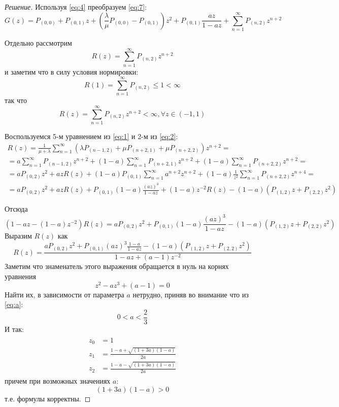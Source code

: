 \documentclass[12pt,a4paper]{article}
\begin{document}
\begin{proof}[Решение]
	Используя \eqref{eq:4} преобразуем \eqref{eq:7}:
	\begin{equation}\label{eq:8}
		G(z) = P_{(0, 0)} + P_{(0, 1)} z + \left(\frac{\lambda}{\mu} P_{(0, 0)} - P_{(0, 1)}\right) z^2 + P_{(0, 1)} \frac{az}{1 - az} + \sum_{n=1}^{\infty}{P_{(n, 2)} z^{n+2}}
	\end{equation}
	
	Отдельно рассмотрим
	\begin{equation*}
		R(z) = \sum_{n=1}^{\infty}{P_{(n, 2)} z^{n+2}}
	\end{equation*}
	и заметим что в силу условия нормировки:
	\begin{equation}\label{eq:11}
		R(1) = \sum_{n=1}^{\infty}{P_{(n, 2)}} \leq 1 < \infty
	\end{equation}
	так что
	\begin{equation}\label{eq:9}
		R(z) = \sum_{n=1}^{\infty}{P_{(n, 2)} z^{n+2}} < \infty, \forall z \in (-1, 1)
	\end{equation}
	
	Воспользуемся 5-м уравнением из \eqref{eq:1} и 2-м из \eqref{eq:2}:
	\begin{multline*}\label{eq:6}
		R(z) = \frac{1}{\mu + \lambda} \sum_{n=1}^{\infty}{\left(\lambda P_{(n-1, 2)} + \mu P_{(n+2, 1)} + \mu P_{(n+2, 2)}\right) z^{n+2}} = \\
		= a \sum_{n=1}^{\infty}{P_{(n-1, 2)} z^{n+2}} + (1 - a)\sum_{n=1}^{\infty}{P_{(n+2, 1)} z^{n+2}} + (1 - a)\sum_{n=1}^{\infty}{P_{(n+2, 2)} z^{n+2}} = \\
		= a P_{(0, 2)} z^2 + azR(z) + (1 - a) P_{(0, 1)} \sum_{n=1}^{\infty}{a^{n+2} z^{n+2}} + (1 - a) \frac{1}{z^2}\sum_{n=1}^{\infty}{P_{(n+2, 2)} z^{n+4}} = \\ 
		= a P_{(0, 2)} z^2 + azR(z) + P_{(0, 1)} (1 - a) \frac{(az)^3}{1 - az} + (1 - a)z^{-2} R(z) - (1 - a) (P_{(1, 2)} z + P_{(2, 2)} z^2)
	\end{multline*}
	
	Отсюда
	\begin{equation*}
		(1 - az - (1-a)z^{-2})R(z) = a P_{(0, 2)} z^2 + P_{(0, 1)} (1 - a) \frac{(az)^3}{1 - az} - (1 - a) (P_{(1, 2)} z + P_{(2, 2)} z^2)
	\end{equation*}
	Выразим $R(z)$ как
	\begin{equation}\label{eq:12}
	R(z) = \frac{a P_{(0, 2)} z^2 + P_{(0, 1)} (az)^3 \frac{1 - a}{1 - az} - (1 - a) (P_{(1, 2)} z + P_{(2, 2)} z^2)}{1 - az + (a-1)z^{-2}}
	\end{equation}
	Заметим что знаменатель этого выражения обращается в нуль на корнях уравнения
	$$z^2 - az^3 + (a - 1) = 0$$
	Найти их, в зависимости от параметра $a$ нетрудно, приняв во внимание что из \eqref{eq:a}:
	$$0 < a < \frac{2}{3}$$
	И так:
	\begin{align}\label{eq:roots}
	\begin{split}
		z_0 &= 1 \\
		z_1 &= \frac{1 - a + \sqrt{(1+3a)(1-a)}}{2a} \\
		z_2 &= \frac{1 - a - \sqrt{(1+3a)(1-a)}}{2a}
	\end{split}
	\end{align}
	причем при возможных значениях $a$:
	$$(1 + 3a)(1 - a) > 0$$
	т.е. формулы корректны.
	

\end{proof}
\end{document}
